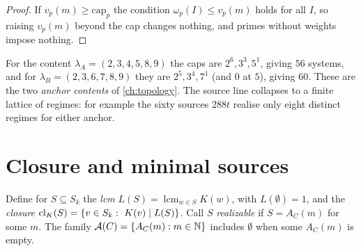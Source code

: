 \begin{proof}
If $v_p(m)\ge\mathrm{cap}_p$ the condition $\omega_p(I)\le v_p(m)$ holds for all $I$, so raising $v_p(m)$ beyond the cap changes nothing, and primes without weights impose nothing.
\end{proof}
For the content $\lambda_A=(2,3,4,5,8,9)$ the caps are $2^6,3^3,5^1$, giving $56$ systems, and for $\lambda_B=(2,3,6,7,8,9)$ they are $2^5,3^4,7^1$ (and $0$ at $5$), giving $60$. These are the two \emph{anchor contents} of \cref{ch:topology}. The source line collapses to a finite lattice of regimes: for example the sixty sources $288t$ realise only eight distinct regimes for either anchor.

\section{Closure and minimal sources}
Define for $S\subseteq S_k$ the \emph{lcm} $L(S)=\operatorname{lcm}_{w\in S}K(w)$, with $L(\emptyset)=1$, and the \emph{closure} $\mathrm{cl}_K(S)=\{v\in S_k:\ K(v)\mid L(S)\}$. Call $S$ \emph{realizable} if $S=A_C(m)$ for some $m$. The family $\mathcal A(C)=\{A_C(m):m\in\mathbb{N}\}$ includes $\emptyset$ when some $A_C(m)$ is empty.

